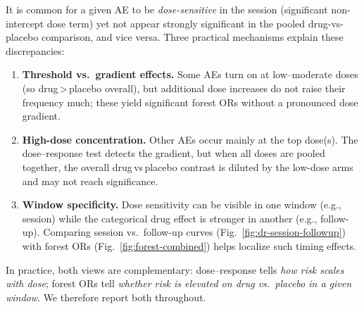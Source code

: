It is common for a given AE to be \emph{dose-sensitive} in the session (significant non-intercept dose term) yet not appear strongly significant in the pooled drug-vs-placebo comparison, and vice versa. Three practical mechanisms explain these discrepancies:

\begin{enumerate}
  \item \textbf{Threshold vs.\ gradient effects.} Some AEs turn on at low–moderate doses (so drug\,>\,placebo overall), but additional dose increases do not raise their frequency much; these yield significant forest ORs without a pronounced dose gradient.
  \item \textbf{High-dose concentration.} Other AEs occur mainly at the top dose(s). The dose–response test detects the gradient, but when all doses are pooled together, the overall drug\,vs\,placebo contrast is diluted by the low-dose arms and may not reach significance.
  \item \textbf{Window specificity.} Dose sensitivity can be visible in one window (e.g., session) while the categorical drug effect is stronger in another (e.g., follow-up). Comparing session vs.\ follow-up curves (Fig.~\ref{fig:dr-session-followup}) with forest ORs (Fig.~\ref{fig:forest-combined}) helps localize such timing effects.
\end{enumerate}

In practice, both views are complementary: dose–response tells \emph{how risk scales with dose}; forest ORs tell \emph{whether risk is elevated on drug vs.\ placebo in a given window}. We therefore report both throughout.
